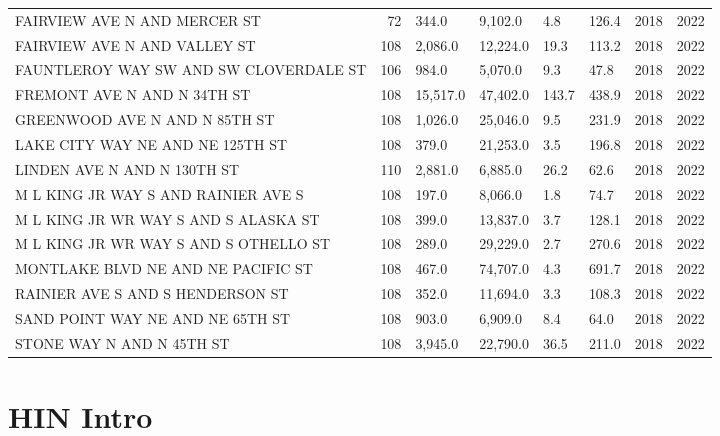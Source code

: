\documentclass[
  letterpaper,
]{scrbook}
\begin{document}
\begin{longtable}[t]{lrllllrr}
FAIRVIEW AVE N AND MERCER ST & 72 & 344.0 & 9,102.0 & 4.8 & 126.4 & 2018 & 2022\\
FAIRVIEW AVE N AND VALLEY ST & 108 & 2,086.0 & 12,224.0 & 19.3 & 113.2 & 2018 & 2022\\
FAUNTLEROY WAY SW AND SW CLOVERDALE ST & 106 & 984.0 & 5,070.0 & 9.3 & 47.8 & 2018 & 2022\\
FREMONT AVE N AND N 34TH ST & 108 & 15,517.0 & 47,402.0 & 143.7 & 438.9 & 2018 & 2022\\
\addlinespace
GREENWOOD AVE N AND N 85TH ST & 108 & 1,026.0 & 25,046.0 & 9.5 & 231.9 & 2018 & 2022\\
LAKE CITY WAY NE AND NE 125TH ST & 108 & 379.0 & 21,253.0 & 3.5 & 196.8 & 2018 & 2022\\
LINDEN AVE N AND N 130TH ST & 110 & 2,881.0 & 6,885.0 & 26.2 & 62.6 & 2018 & 2022\\
M L KING JR WAY S AND RAINIER AVE S & 108 & 197.0 & 8,066.0 & 1.8 & 74.7 & 2018 & 2022\\
M L KING JR WR WAY S AND S ALASKA ST & 108 & 399.0 & 13,837.0 & 3.7 & 128.1 & 2018 & 2022\\
\addlinespace
M L KING JR WR WAY S AND S OTHELLO ST & 108 & 289.0 & 29,229.0 & 2.7 & 270.6 & 2018 & 2022\\
MONTLAKE BLVD NE AND NE PACIFIC ST & 108 & 467.0 & 74,707.0 & 4.3 & 691.7 & 2018 & 2022\\
RAINIER AVE S AND S HENDERSON ST & 108 & 352.0 & 11,694.0 & 3.3 & 108.3 & 2018 & 2022\\
SAND POINT WAY NE AND NE 65TH ST & 108 & 903.0 & 6,909.0 & 8.4 & 64.0 & 2018 & 2022\\
STONE WAY N AND N 45TH ST & 108 & 3,945.0 & 22,790.0 & 36.5 & 211.0 & 2018 & 2022\\
\bottomrule
\end{longtable}

\hypertarget{hin-intro}{%
\chapter{HIN Intro}\label{hin-intro}}
\end{document}
